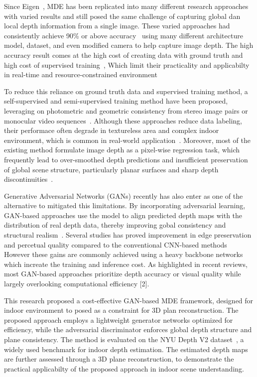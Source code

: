 \documentclass[a4paper,12pt]{article}
\begin{document}
Since Eigen~\cite{eigen14062283}, MDE has been replicated into many different research approaches with varied results and still posed the same challenge of capturing global dan local depth information from a single image.
These varied approaches had consistently achieve 90\% or above accuracy~\cite{khan20082272} using many different architecture model, dataset, and even modified camera to help capture image depth.
The high accuracy result comes at the high cost of creating data with ground truth and high cost of supervised training~\cite{zhao101007,masomians22145353,khan20082272},
Which limit their practicality and applicabilty in real-time and resource-constrained environment~\cite{zhao101007,khan20082272}

To reduce this reliance on ground truth data and supervised training method, a self-supervised and semi-supervised training method have been proposed,
leveraging on photometric and geometric consistency from stereo image pairs or monocular video sequences~\cite{Zhou2017Unsupervised,Godard2017Monodepth}.
Although these approaches reduce data labeling, their performace often degrade in textureless area and complex indoor environment, which is common in real-world application~\cite{masomians22145353}.
Moreover, most of the existing method formulate image depth as a pixel-wise regression task, which frequently lead to over-smoothed depth predictions and insufficient preservation of global scene structure, 
particularly planar surfaces and sharp depth discontinuities~\cite{khan20082272}.

Generative Adversarial Networks (GANs) recently has also enter as one of the alternative to mitigated this limitations. 
By incorporating adversarial learning, GAN-based approaches use the model to align predicted depth maps with the distribution of real depth data, 
thereby improving gobal consistency and structural realism~\cite{Zhang2018GANDepth,Isola2018CGan,Hao2023GAN}.
Several studies has proved improvement in edge preservation and percetual quality compared to the conventional CNN-based methods
However these gains are commonly achieved using a heavy backbone networks which increate the training and inference cost.
As highlighted in recent reviews, most GAN-based approaches prioritize depth accuracy or visual quality while largely overlooking computational efficiency [2].

This research proposed a cost-effective GAN-based MDE framework, designed for indoor environment to posed as a constraint for 3D plan reconstruction.
The proposed approach employs a lightweight generator networks optimized for efficiency, while the adversarial discriminator enforces global depth structure and plane consistency.
The method is evaluated on the NYU Depth V2 dataset~\cite{Silberman2012NYU}, a widely used benchmark for indoor depth estimation.
The estimated depth maps are further assessed through a 3D plane reconstruction, to demonstrate the practical applicabilty of the proposed approach in indoor scene understanding.
\end{document}
